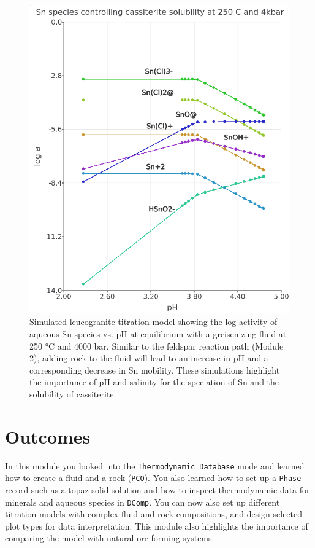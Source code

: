 \documentclass[
]{book}
\begin{document}
\begin{figure}
\includegraphics[width=0.8\linewidth]{figures/module3/fig-23} \caption{Simulated leucogranite titration model showing the log activity of aqueous Sn species vs. pH at equilibrium with a greisenizing fluid at 250 °C and 4000 bar. Similar to the feldspar reaction path (Module 2), adding rock to the fluid will lead to an increase in pH and a corresponding decrease in Sn mobility. These simulations highlight the importance of pH and salinity for the speciation of Sn and the solubility of cassiterite. }\label{fig:fig-23c}
\end{figure}

\hypertarget{outcomes-2}{%
\section{Outcomes}\label{outcomes-2}}

In this module you looked into the \texttt{Thermodynamic\ Database} mode and learned how to create a fluid and a rock (\texttt{PCO}). You also learned how to set up a \texttt{Phase} record such as a topaz solid solution and how to inspect thermodynamic data for minerals and aqueous species in \texttt{DComp}. You can now also set up different titration models with complex fluid and rock compositions, and design selected plot types for data interpretation. This module also highlights the importance of comparing the model with natural ore-forming systems.
\end{document}

